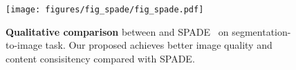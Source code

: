\begin{figure}[!ht]
\vspace{-8pt}
\centering
\texttt{[image: figures/fig\_spade/fig\_spade.pdf]}
\vspace{-10pt}
\caption{
    \textbf{Qualitative comparison} between \method and SPADE~\cite{park2019SPADE} on segmentation-to-image task.
    Our proposed \method achieves better image quality and content consisitency compared with SPADE.
}
\label{fig:spade}
\end{figure}
